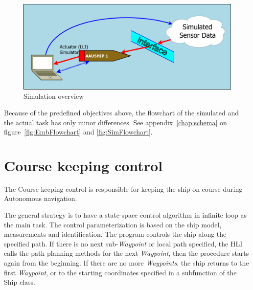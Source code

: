 \begin{figure}[htbp]
\centering
\includegraphics[width = \textwidth]{img/HLIFigures/ActorModel/SimModel.png}
\caption{Simulation overview}
\label{fig:sim_model}
\end{figure}

Because of the predefined objectives above, the flowchart of the simulated and the actual task has only minor differences. See appendix~\vref{chap:schema} on figure~\vref{fig:EmbFlowchart} and \vref{fig:SimFlowchart}.

\section{Course keeping control}

The Course-keeping control is responsible for keeping the ship on-course during Autonomous navigation.

The general strategy is to have a state-space control algorithm in infinite loop as the main task. The control parameterization is based on the ship model, measurements and identification.
The program controls the ship along the specified path. If there is no next sub-\emph{Waypoint} or local path specified, the HLI calls the path planning methods for the next \emph{Waypoint}, then the procedure starts again from the beginning. If there are no more \emph{Waypoints}, the ship returns to the first \emph{Waypoint}, or to the starting coordinates specified in a subfunction of the Ship class.

